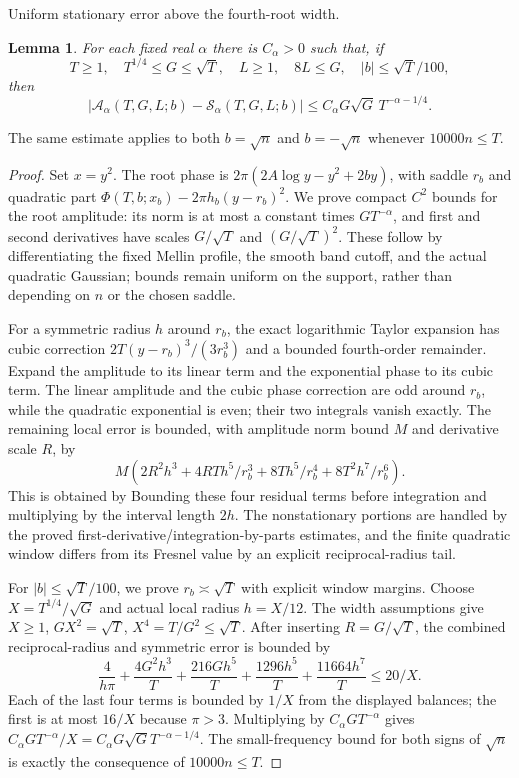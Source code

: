 \documentclass[11pt,a4paper]{article}
\numberwithin{equation}{section}
\newtheorem{lemma}[theorem]{Lemma}
\theoremstyle{definition}
\begin{document}
\par\medskip\noindent Uniform stationary error above the fourth-root width.
\begin{lemma}\label{lem:stationaryerror}
For each fixed real $\alpha$ there is $C_\alpha>0$ such that, if
\[
 T\ge1,\quad T^{1/4}\le G\le\sqrt T,\quad L\ge1,\quad8L\le G,
 \quad |b|\le\sqrt T/100,
\]
then
\[
 |\mathcal A_\alpha(T,G,L;b)-\mathcal S_\alpha(T,G,L;b)|
 \le C_\alpha G\sqrt G\,T^{-\alpha-1/4}.
\]
\end{lemma}
The same estimate applies to both $b=\sqrt n$ and $b=-\sqrt n$ whenever
$10000n\le T$.
\begin{proof}
Set $x=y^2$. The root phase is
$2\pi(2A\log y-y^2+2by)$, with saddle $r_b$ and quadratic part
$\Phi(T,b;x_b)-2\pi h_b(y-r_b)^2$.
We prove compact $C^2$ bounds for the root amplitude: its norm is at
most a constant times $GT^{-\alpha}$, and first and second derivatives have
scales $G/\sqrt T$ and $(G/\sqrt T)^2$. These follow by differentiating the
fixed Mellin profile, the smooth band cutoff, and the actual quadratic
Gaussian; bounds remain uniform on the support, rather than depending on
$n$ or the chosen saddle.

For a symmetric radius $h$ around $r_b$, the exact logarithmic Taylor
expansion has cubic correction $2T(y-r_b)^3/(3r_b^3)$ and a bounded
fourth-order remainder. Expand the amplitude to its linear term and the
exponential phase to its cubic term. The linear amplitude and the cubic phase
correction are odd around $r_b$, while the quadratic exponential is even;
their two integrals vanish exactly. The remaining local error is bounded,
with amplitude norm bound $M$ and derivative scale $R$, by
\[
 M\left(2R^2h^3+4RT h^5/r_b^3+8Th^5/r_b^4+8T^2h^7/r_b^6\right).
\]
This is obtained by Bounding these four residual terms before integration
and multiplying by the interval length $2h$. The nonstationary portions are
handled by the proved first-derivative/integration-by-parts estimates, and
the finite quadratic window differs from its Fresnel value by an explicit
reciprocal-radius tail.

For $|b|\le\sqrt T/100$, we prove $r_b\asymp\sqrt T$ with explicit
window margins. Choose
$X=T^{1/4}/\sqrt G$ and actual local radius $h=X/12$.
The width assumptions give
$X\ge1$, $GX^2=\sqrt T$, $X^4=T/G^2\le\sqrt T$.
After inserting $R=G/\sqrt T$, the combined reciprocal-radius and symmetric
error is bounded by
\[
 \frac4{h\pi}+\frac{4G^2h^3}T+\frac{216Gh^5}T
       +\frac{1296h^5}T+\frac{11664h^7}T\le20/X.
\]
Each of the last four terms is bounded by $1/X$ from the displayed balances;
the first is at most $16/X$ because $\pi>3$.
Multiplying by $C_\alpha GT^{-\alpha}$ gives
$C_\alpha GT^{-\alpha}/X=C_\alpha G\sqrt G T^{-\alpha-1/4}$.
The small-frequency bound for both signs of $\sqrt n$ is exactly the
consequence of $10000n\le T$.
\end{proof}
\end{document}

